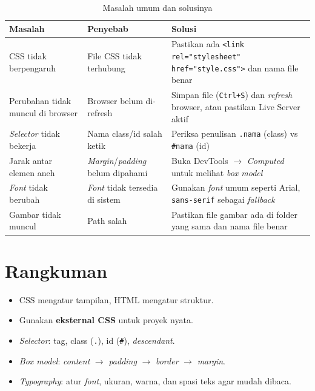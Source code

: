 \begin{table}[h!]
\centering
\caption{Masalah umum dan solusinya}
\label{tab:trouble-05}
\begin{tabular}{|p{3.5cm}|p{4cm}|p{5cm}|}
\hline
\textbf{Masalah} & \textbf{Penyebab} & \textbf{Solusi} \\
\hline
CSS tidak berpengaruh & File CSS tidak terhubung & Pastikan ada \texttt{<link rel="stylesheet" href="style.css">} dan nama file benar \\
\hline
Perubahan tidak muncul di browser & Browser belum di-refresh & Simpan file (\texttt{Ctrl+S}) dan \emph{refresh} browser, atau pastikan Live Server aktif \\
\hline
\emph{Selector} tidak bekerja & Nama class/id salah ketik & Periksa penulisan \texttt{.nama} (class) vs \texttt{\#nama} (id) \\
\hline
Jarak antar elemen aneh & \emph{Margin}/\emph{padding} belum dipahami & Buka DevTools $\rightarrow$ \emph{Computed} untuk melihat \emph{box model} \\
\hline
\emph{Font} tidak berubah & \emph{Font} tidak tersedia di sistem & Gunakan \emph{font} umum seperti Arial, \texttt{sans-serif} sebagai \emph{fallback} \\
\hline
Gambar tidak muncul & Path salah & Pastikan file gambar ada di folder yang sama dan nama file benar \\
\hline
\end{tabular}
\end{table}

\section{Rangkuman}
\label{sec:rangkuman-minggu05}

\begin{itemize}
  \item CSS mengatur tampilan, HTML mengatur struktur.
  \item Gunakan \textbf{eksternal CSS} untuk proyek nyata.
  \item \emph{Selector}: tag, class (\texttt{.}), id (\texttt{\#}), \emph{descendant}.
  \item \emph{Box model}: \emph{content} $\rightarrow$ \emph{padding} $\rightarrow$ \emph{border} $\rightarrow$ \emph{margin}.
  \item \emph{Typography}: atur \emph{font}, ukuran, warna, dan spasi teks agar mudah dibaca.
\end{itemize}
